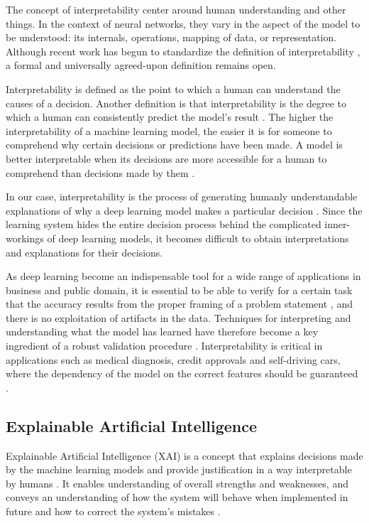 The concept of interpretability center around human understanding and other things. In the context of neural networks, they vary in the aspect of the model to be understood: its internals, operations, mapping of data, or representation. Although recent work has begun to standardize the definition of interpretability \cite{Lipton2018}, a formal and universally agreed-upon definition remains open.

Interpretability is defined as the point to which a human can understand the causes of a decision. Another definition is that interpretability is the degree to which a human can consistently predict the model’s result \cite{molnar}. The higher the interpretability of a machine learning model, the easier it is for someone to comprehend why certain decisions or predictions have been made. A model is better interpretable when its decisions are more accessible for a human to comprehend than decisions made by them \cite{molnar}.
    
In our case, interpretability is the process of generating humanly understandable explanations of why a deep learning model makes a particular decision \cite{Sacha2017}. Since the learning system hides the entire decision process behind the complicated inner-workings of deep learning models, it becomes difficult to obtain interpretations and explanations for their decisions.

As deep learning become an indispensable tool for a wide range of applications in business and public domain, it is essential to be able to verify for a certain task that the accuracy results from the proper framing of a problem statement \cite{Liu2017}, and there is no exploitation of artifacts in the data. Techniques for interpreting and understanding what the model has learned have therefore become a key ingredient of a robust validation procedure \cite{taylor2006methods} \cite{hansen2011visual} \cite{bach2015pixel}. Interpretability is critical in applications such as medical diagnosis, credit approvals and self-driving cars, where the dependency of the model on the correct features should be guaranteed \cite{Caruana:2015:IMH:2783258.2788613} \cite{bojarski2017explaining}.

\subsection{Explainable Artificial Intelligence}
Explainable Artificial Intelligence (XAI) is a concept that explains decisions made by the machine learning models and provide justification in a way interpretable by humans \cite{Gunning}. It enables understanding of overall strengths and weaknesses, and conveys an understanding of how the system will behave when implemented in future and how to correct the system’s mistakes \cite{Gunning}.

